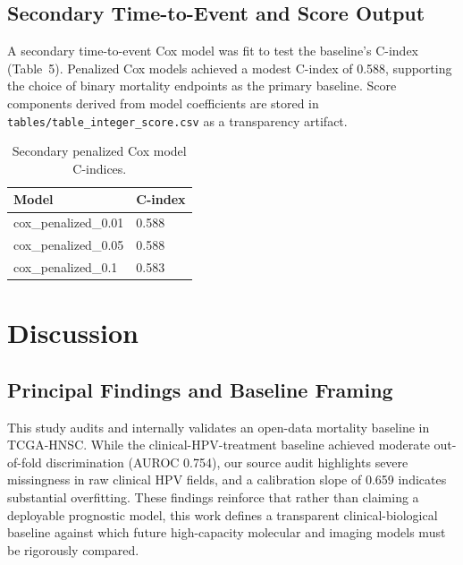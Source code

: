 \documentclass[11pt]{article}
\begin{document}
\begin{table}[H]
\centering
\caption{Model performance stratified by anatomical site.}
\scriptsize
{}
\end{table}

\subsection{Secondary Time-to-Event and Score Output}
A secondary time-to-event Cox model was fit to test the baseline's C-index (Table~5). Penalized Cox models achieved a modest C-index of 0.588, supporting the choice of binary mortality endpoints as the primary baseline. Score components derived from model coefficients are stored in \texttt{tables/table\_integer\_score.csv} as a transparency artifact.

\begin{table}[H]
\centering
\caption{Secondary penalized Cox model C-indices.}
\begin{tabular}{ll}
\toprule
Model & C-index \\
\midrule
cox\_penalized\_0.01 & 0.588 \\
cox\_penalized\_0.05 & 0.588 \\
cox\_penalized\_0.1 & 0.583 \\
\bottomrule
\end{tabular}
\end{table}

\section{Discussion}
\subsection{Principal Findings and Baseline Framing}
This study audits and internally validates an open-data mortality baseline in TCGA-HNSC. While the clinical-HPV-treatment baseline achieved moderate out-of-fold discrimination (AUROC 0.754), our source audit highlights severe missingness in raw clinical HPV fields, and a calibration slope of 0.659 indicates substantial overfitting. These findings reinforce that rather than claiming a deployable prognostic model, this work defines a transparent clinical-biological baseline against which future high-capacity molecular and imaging models must be rigorously compared.
\end{document}
